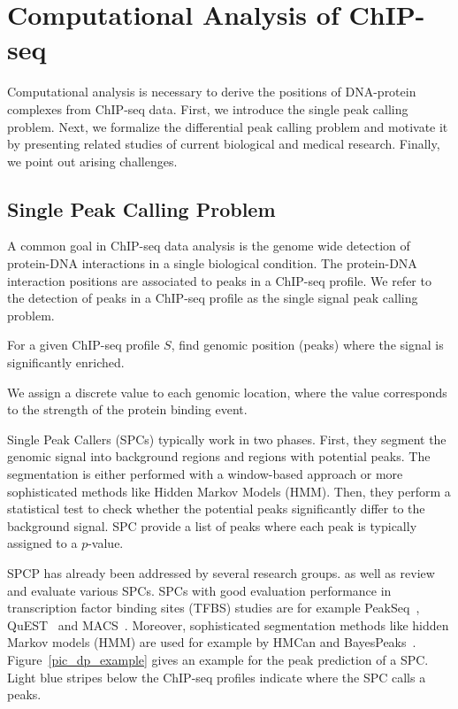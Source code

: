 \section{Computational Analysis of ChIP-seq}
Computational analysis is necessary to derive the positions of DNA-protein complexes from ChIP-seq data.
First, we introduce the single peak calling problem.
Next, we formalize the differential peak calling problem and motivate it by presenting related studies of current biological and medical research.
Finally, we point out arising challenges.

\subsection{Single Peak Calling Problem}
\label{sec_spcp}
A common goal in ChIP-seq data analysis is the genome wide detection of protein-DNA interactions in a single biological condition.
The protein-DNA interaction positions are associated to peaks in a ChIP-seq profile.
We refer to the detection of peaks in a ChIP-seq profile as the single signal peak calling problem.

\begin{mydef}
  For a given ChIP-seq profile $S$, find genomic position (peaks) where the signal is significantly enriched.
\end{mydef}

\noindent
We assign a discrete value to each genomic location, where the value corresponds to the strength of the protein binding event.

Single Peak Callers (SPCs) typically work in two phases.
First, they segment the genomic signal into background regions and regions with potential peaks.
The segmentation is either performed with a window-based approach or more sophisticated methods like Hidden Markov Models (HMM).
Then, they perform a statistical test to check whether the potential peaks significantly differ to the background signal.
SPC provide a list of peaks where each peak is typically assigned to a $p$-value.

SPCP has already been addressed by several research groups.
\cite{wilbanks2010} as well as \cite{Chen2012} review and evaluate various SPCs.
SPCs with good evaluation performance in transcription factor binding sites (TFBS) studies are for example PeakSeq~\citep{Rozowsky2009}, QuEST~\citep{valouev2008} and MACS~\citep{zhang2008}.
Moreover, sophisticated segmentation methods like hidden Markov models (HMM) are used for example by HMCan \citep{ashoor2013} and BayesPeaks~\citep{spyrou2009}.
Figure~\ref{pic_dp_example} gives an example for the peak prediction of a SPC.
Light blue stripes below the ChIP-seq profiles indicate where the SPC calls a peaks.

